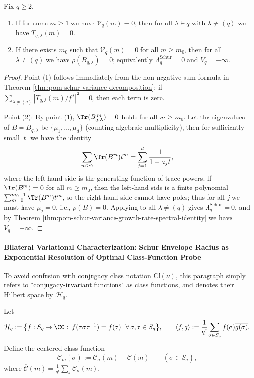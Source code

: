 \begin{proposition}\label{prop:pom-variance-vanishing-implies-nilpotent-channels}
Fix \(q\ge 2\).
\begin{enumerate}
  \item If for some \(m\ge 1\) we have \(\mathcal V_q(m)=0\), then for all \(\lambda\vdash q\) with \(\lambda\neq(q)\) we have \(T_{q,\lambda}(m)=0\).
  \item If there exists \(m_0\) such that \(\mathcal V_q(m)=0\) for all \(m\ge m_0\), then for all \(\lambda\neq(q)\) we have \(\rho(B_{q,\lambda})=0\); equivalently \(\Lambda_q^{\mathrm{Schur}}=0\) and \(V_q=-\infty\).
\end{enumerate}
\end{proposition}
\begin{proof}
Point (1) follows immediately from the non-negative sum formula in Theorem \ref{thm:pom-schur-variance-decomposition}: if \(\sum_{\lambda\neq(q)}|T_{q,\lambda}(m)/f^\lambda|^2=0\), then each term is zero.
\par
Point (2): By point (1), \(\Tr(B_{q,\lambda}^{\,m})=0\) holds for all \(m\ge m_0\).
Let the eigenvalues of \(B=B_{q,\lambda}\) be \(\{\mu_1,\dots,\mu_d\}\) (counting algebraic multiplicity), then for sufficiently small \(|t|\) we have the identity
\[
\sum_{m\ge 0}\Tr(B^{m})t^{m}=\sum_{j=1}^{d}\frac{1}{1-\mu_j t},
\]
where the left-hand side is the generating function of trace powers.
If \(\Tr(B^{m})=0\) for all \(m\ge m_0\), then the left-hand side is a finite polynomial \(\sum_{m=0}^{m_0-1}\Tr(B^{m})t^{m}\), so the right-hand side cannot have poles;
thus for all \(j\) we must have \(\mu_j=0\), i.e., \(\rho(B)=0\).
Applying to all \(\lambda\neq(q)\) gives \(\Lambda_q^{\mathrm{Schur}}=0\), and by Theorem \ref{thm:pom-schur-variance-growth-rate-spectral-identity} we have \(V_q=-\infty\).
\end{proof}

\paragraph{Bilateral Variational Characterization: Schur Envelope Radius as Exponential Resolution of Optimal Class-Function Probe}
To avoid confusion with conjugacy class notation \(\mathrm{Cl}(\nu)\), this paragraph simply refers to "conjugacy-invariant functions" as class functions, and denotes their Hilbert space by \(\mathcal H_q\).

\begin{definition}\label{def:pom-class-functions-centered-cycle-monomials}
Let
\[
\mathcal H_q:=\bigl\{f:S_q\to\CC:\ f(\tau\sigma\tau^{-1})=f(\sigma)\ \ \forall\,\sigma,\tau\in S_q\bigr\},
\qquad
\langle f,g\rangle:=\frac{1}{q!}\sum_{\sigma\in S_q}f(\sigma)\overline{g(\sigma)}.
\]
Define the centered class function
\[
\mathcal C_m(\sigma):=\mathcal C_\sigma(m)-\overline{\mathcal C}(m)\qquad(\sigma\in S_q),
\]
where \(\overline{\mathcal C}(m)=\frac{1}{q!}\sum_{\sigma}\mathcal C_\sigma(m)\).
\end{definition}


